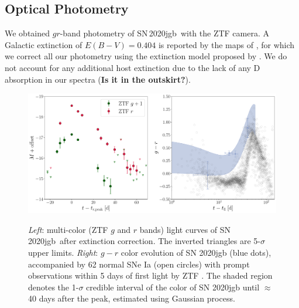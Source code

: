 \documentclass[twocolumn]{aastex631}
\newcommand\sn{SN\,2020jgb}
\begin{document}
\subsection{Optical Photometry}
We obtained $gr$-band photometry of \sn\ with the ZTF camera. A Galactic extinction of $E(B-V)=0.404$ is reported by the maps of \citet{Schlafly2011}, for which we correct all our photometry using the extinction model proposed by \citet{Fitzpatrick1999}. We do not account for any additional host extinction due to the lack of any  D absorption in our spectra (\textbf{Is it in the outskirt?}).
\begin{figure}
    \centering
    \includegraphics[width=\textwidth]{photometry.pdf}
    \label{fig:photometry}
    \caption{\textit{Left}: multi-color (ZTF $g$ and $r$ bands) light curves of \sn\ after extinction correction. The inverted triangles are 5-$\sigma$ upper limits. \textit{Right}: $g-r$ color evolution of SN 2020jgb (blue dots), accompanied by 62 normal SNe Ia (open circles) with prompt observations within 5 days of first light by ZTF \citep{Bulla2020}. The shaded region denotes the 1-$\sigma$ credible interval of the color of SN 2020jgb until $\approx$40 days after the peak, estimated using Gaussian process.}
\end{figure}
\end{document}

